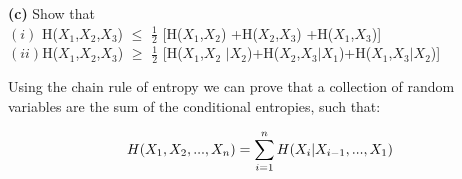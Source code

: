 \documentclass[11pt]{article}
\begin{document}
\begin{tcolorbox}
\textbf{(c)}
Show that\\
$(i)$ H($X_{1}$,$X_{2}$,$X_{3}$) $\leq$ $\frac{1}{2}$ [H($X_{1}$,$X_{2}$) +H($X_{2}$,$X_{3}$) +H($X_{1}$,$X_{3}$)]\\

$(ii)$H($X_{1}$,$X_{2}$,$X_{3}$) $\geq$ $\frac{1}{2}$ [H($X_{1}$,$X_{2}$ $|$$X_{2}$)+H($X_{2}$,$X_{3}$$|$$X_{1}$)+H($X_{1}$,$X_{3}$$|$$X_{2}$)]\\

\end{tcolorbox}
Using the chain rule of entropy we can prove that a collection of random variables are the sum of the conditional entropies, such that:

\begin{equation*}
H(X_{1},X_{2},...,X_{n}) = \sum_{i=1}^{n} H(X_{i}|X_{i-1},...,X_{1})\\
\end{equation*}
\end{document}
